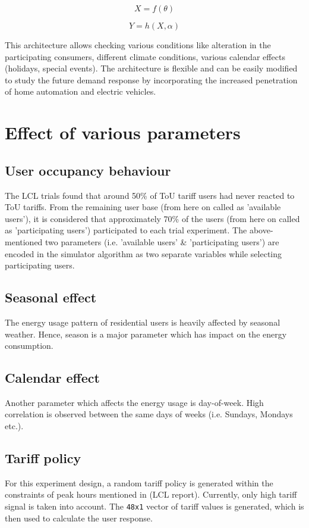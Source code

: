 \begin{equation}
    X = f(\theta)
\end{equation}
    
\begin{equation}
     Y = h(X, \alpha)
\end{equation}

This architecture allows checking various conditions like alteration in the participating consumers, different climate conditions, various calendar effects (holidays, special events). The architecture is flexible and can be easily modified to study the future demand response by incorporating the increased penetration of home automation and electric vehicles.

\section{Effect of various parameters}
\subsection{User occupancy behaviour}
\label{user-occupancy}
The LCL trials found that around 50\% of ToU tariff users had never reacted to ToU tariffs. From the remaining user base (from here on called as 'available users'), it is considered that approximately 70\% of the users (from here on called as 'participating users') participated to each trial experiment. The above-mentioned two parameters (i.e. 'available users' \& 'participating users') are encoded in the simulator algorithm as two separate variables while selecting participating users.

\subsection{Seasonal effect}
The energy usage pattern of residential users is heavily affected by seasonal weather. Hence, season is a major parameter which has impact on the energy consumption.

\subsection{Calendar effect}
Another parameter which affects the energy usage is day-of-week. High correlation is observed between the same days of weeks (i.e. Sundays, Mondays etc.). 

\subsection{Tariff policy}
For this experiment design, a random tariff policy is generated within the constraints of peak hours mentioned in (LCL report). Currently, only high tariff signal is taken into account. The \texttt{48x1} vector of tariff values is generated, which is then used to calculate the user response.

